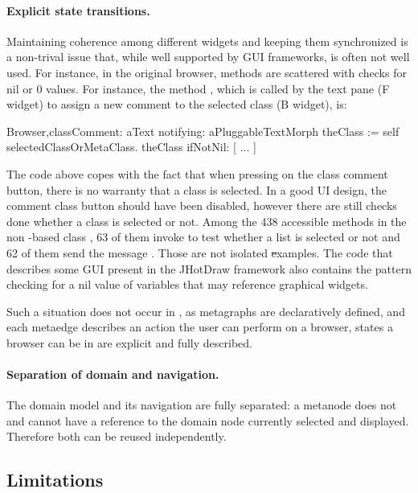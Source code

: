 \documentclass[a4paper,10pt,twoside]{book}
\begin{document}
\paragraph{Explicit state transitions.} Maintaining coherence among different widgets and keeping them synchronized is a non-trival issue that, while well supported by GUI frameworks,  is often not well used. For instance, in the original \pharo browser, methods are scattered with checks for nil or 0 values. For instance, the method , which is called by the text pane (F widget) to assign a new comment to the selected class (B widget), is:

\begin{code}
Browser\sep{}classComment: aText notifying: aPluggableTextMorph 
    theClass := self selectedClassOrMetaClass.
    theClass
        ifNotNil: [ ... ]
\end{code}

The code above copes with the fact that when pressing on the class comment button, there is no warranty that a class is selected. In a good UI design, the comment class button should have been disabled, however there are still checks done whether a class is selected or not. Among the 438 accessible methods in the non \ob-based \pharo class , 63 of them invoke  to test whether a list is selected or not and 62 of them send the message . Those are not isolated \st examples. The code that describes some GUI present in the JHotDraw framework also contains the pattern checking for a nil value of variables that may reference graphical widgets. 

Such a situation does not occur in \obf, as metagraphs are declaratively defined, and each metaedge describes an action the user can perform on a browser, states a browser can be in are explicit and fully described.

\paragraph{Separation of domain and navigation.} The domain model and its navigation are fully separated: a metanode does not and cannot have a reference to the domain node currently selected and displayed. Therefore both can be reused independently.

\subsection{Limitations} 
\end{document}
